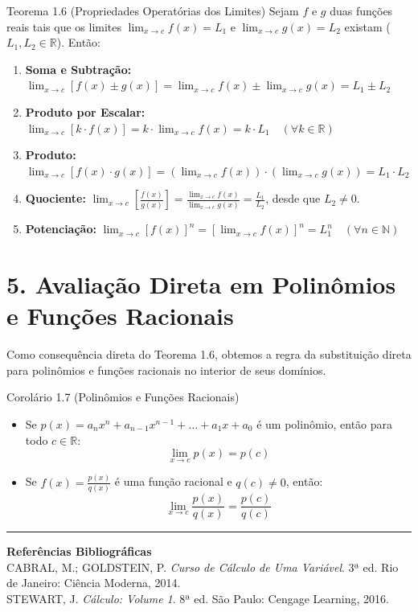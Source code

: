 \documentclass[12pt,a4paper]{article}
\begin{document}
\begin{definicao}{Teorema 1.6 (Propriedades Operatórias dos Limites)}
    Sejam $f$ e $g$ duas funções reais tais que os limites $\lim_{x \to c} f(x) = L_1$ e $\lim_{x \to c} g(x) = L_2$ existam ($L_1, L_2 \in \mathbb{R}$). Então:
    \begin{enumerate}[label=\alph*)]
        \item \textbf{Soma e Subtração:} $\lim_{x \to c} [f(x) \pm g(x)] = \lim_{x \to c} f(x) \pm \lim_{x \to c} g(x) = L_1 \pm L_2$
        \item \textbf{Produto por Escalar:} $\lim_{x \to c} [k \cdot f(x)] = k \cdot \lim_{x \to c} f(x) = k \cdot L_1 \quad (\forall k \in \mathbb{R})$
        \item \textbf{Produto:} $\lim_{x \to c} [f(x) \cdot g(x)] = \left(\lim_{x \to c} f(x)\right) \cdot \left(\lim_{x \to c} g(x)\right) = L_1 \cdot L_2$
        \item \textbf{Quociente:} $\lim_{x \to c} \left[\frac{f(x)}{g(x)}\right] = \frac{\lim_{x \to c} f(x)}{\lim_{x \to c} g(x)} = \frac{L_1}{L_2}$, desde que $L_2 \neq 0$.
        \item \textbf{Potenciação:} $\lim_{x \to c} [f(x)]^n = \left[\lim_{x \to c} f(x)\right]^n = L_1^n \quad (\forall n \in \mathbb{N})$
    \end{enumerate}
\end{definicao}

\vspace{0.4cm}

\section*{5. Avaliação Direta em Polinômios e Funções Racionais}

Como consequência direta do Teorema 1.6, obtemos a regra da substituição direta para polinômios e funções racionais no interior de seus domínios.

\begin{definicao}{Corolário 1.7 (Polinômios e Funções Racionais)}
    \begin{itemize}[leftmargin=*]
        \item Se $p(x) = a_n x^n + a_{n-1} x^{n-1} + \dots + a_1 x + a_0$ é um polinômio, então para todo $c \in \mathbb{R}$:
        $$\lim_{x \to c} p(x) = p(c)$$
        \item Se $f(x) = \frac{p(x)}{q(x)}$ é uma função racional e $q(c) \neq 0$, então:
        $$\lim_{x \to c} \frac{p(x)}{q(x)} = \frac{p(c)}{q(c)}$$
    \end{itemize}
\end{definicao}

\vspace{0.8cm}
\hrule
\vspace{0.3cm}

\begin{center}
    \small \textbf{Referências Bibliográficas} \\
    CABRAL, M.; GOLDSTEIN, P. \textit{Curso de Cálculo de Uma Variável}. 3ª ed. Rio de Janeiro: Ciência Moderna, 2014. \\
    STEWART, J. \textit{Cálculo: Volume 1}. 8ª ed. São Paulo: Cengage Learning, 2016.
\end{center}
\end{document}
